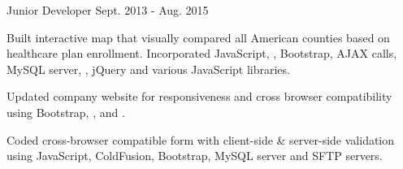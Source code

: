 \begin{cventries}
  \cventry
    {Junior Developer} %
    {} %
    {} %
    {Sept. 2013 - Aug. 2015} %
    {
      \begin{cvitems} %
        \item {Built interactive map that visually compared all American counties based on healthcare plan enrollment. Incorporated JavaScript, , Bootstrap, AJAX calls, MySQL server, , jQuery and various JavaScript libraries.}
        \item {Updated company website for responsiveness and cross browser compatibility using Bootstrap, , and .}
        \item {Coded cross-browser compatible form with client-side \& server-side validation using JavaScript, ColdFusion, Bootstrap, MySQL server and SFTP servers.}
      \end{cvitems}
    }


\end{cventries}
